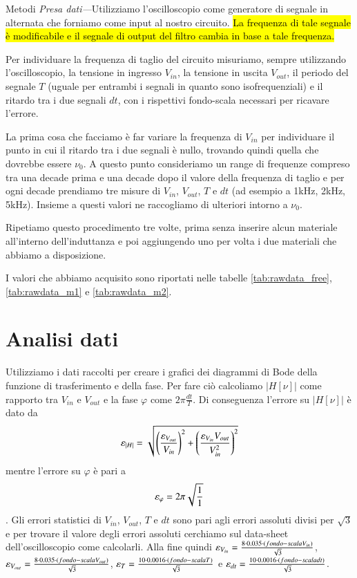 \documentclass[
    rmp,
    reprint, 
    superscriptaddress, 
    altaffilletter, 
    amsmath, 
    amssymb, 
    a4paper]{revtex4-2}
\begin{document}
\begin{methods}{Metodi}
    \noindent\textit{Presa dati---}Utilizziamo l'oscilloscopio come generatore di segnale in alternata che forniamo come input al nostro circuito. \hl{La frequenza di tale segnale \`e modificabile e il segnale di output del filtro cambia in base a tale frequenza.}
    
    Per individuare la frequenza di taglio del circuito misuriamo, sempre utilizzando l'oscilloscopio, la tensione in ingresso $V_{in}$, la tensione in uscita $V_{out}$, il periodo del segnale $T$ (uguale per entrambi i segnali in quanto sono isofrequenziali) e il ritardo tra i due segnali $dt$, con i rispettivi fondo-scala necessari per ricavare l'errore. 

    La prima cosa che facciamo è far variare la frequenza di $V_{in}$ per individuare il punto in cui il ritardo tra i due segnali è nullo, trovando quindi quella che dovrebbe essere $\nu_{0}$. A questo punto consideriamo un range di frequenze compreso tra una decade prima e una decade dopo il valore della frequenza di taglio e per ogni decade prendiamo tre misure di $V_{in}$, $V_{out}$, $T$ e $dt$ (ad esempio a 1kHz, 2kHz, 5kHz). Insieme a questi valori ne raccogliamo di ulteriori intorno a $\nu_{0}$.

    Ripetiamo questo procedimento tre volte, prima senza inserire alcun materiale all'interno dell'induttanza e poi aggiungendo uno per volta i due materiali che abbiamo a disposizione.
    
    I valori che abbiamo acquisito sono riportati nelle tabelle \ref{tab:rawdata_free}, \ref{tab:rawdata_m1} e \ref{tab:rawdata_m2}.
        
    \end{methods}

\section*{Analisi dati}
Utilizziamo i dati raccolti per creare i grafici dei diagrammi di Bode della funzione di trasferimento e della fase. Per fare ciò calcoliamo $\big|H[\nu]\big|$ come rapporto tra $V_{in}$ e $V_{out}$ e la fase $\varphi$ come $2\pi\frac{dt}{T}$. Di conseguenza l'errore su $\big|H[\nu]\big|$ è dato da \[\varepsilon_{|H|}=\sqrt{\left(\frac{\varepsilon_{V_{out}}}{V_{in}}\right)^2+\left(\frac{\varepsilon_{V_{in}}V_{out}}{V_{in}^2}\right)^2}\] mentre l'errore su $\varphi$ è pari a \[\varepsilon_{\varphi}=2\pi\sqrt{\frac{1}{1}}\]. Gli errori statistici di $V_{in}$, $V_{out}$, $T$ e $dt$ sono pari agli errori assoluti divisi per $\sqrt{3}$ e per trovare il valore degli errori assoluti cerchiamo sul data-sheet dell'oscilloscopio come calcolarli. Alla fine quindi $\varepsilon_{V_{in}}=\frac{8\cdot 0.035\cdot (fondo-scala V_{in})}{\sqrt{3}}$, $\varepsilon_{V_{out}}=\frac{8\cdot 0.035 \cdot (fondo-scala V_{out})}{\sqrt{3}}$, $\varepsilon_{T}=\frac{10\cdot 0.0016 \cdot (fondo-scala T)}{\sqrt{3}}$ e $\varepsilon_{dt}=\frac{10\cdot 0.0016 \cdot (fondo-scala dt)}{\sqrt{3}}$. 
\end{document}
